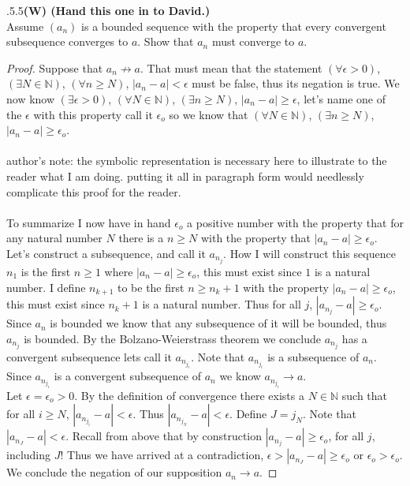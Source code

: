 \documentclass[12pt]{article}
\makeatletter
\theoremstyle{homework}
\newenvironment{exercise}[1]
{\def\@currentlabel{#1}\exercisecore}
{\endexercisecore}
\newcommand\W{{\color{red}\textbf{(W) (Hand this one in to David.)}}}
\makeatother
\begin{document}
\newpage
\begin{exercise}

2.5.5\W\\
Assume $(a_n)$ is a bounded sequence with the property that every convergent subsequence converges to $a$.  Show that $a_n$ must converge to $a$.
\end{exercise}
\begin{proof}
Suppose that $a_n\not\rightarrow a$.  That must mean that the statement $(\forall \epsilon>0)$, $(\exists N\in\mathbb{N})$, $(\forall n\geq N)$, $|a_n-a|<\epsilon$ must be false, thus its negation is true.  We now know $(\exists \epsilon>0)$, $(\forall N\in\mathbb{N})$, $(\exists n\geq N)$, $|a_n-a|\geq \epsilon$, let's name one of the $\epsilon$ with this property call it $\epsilon_o$ so we know that $(\forall N\in\mathbb{N})$, $(\exists n\geq N)$, $|a_n-a|\geq \epsilon_o$.\\\\
author's note: the symbolic representation is necessary here to illustrate to the reader what I am doing.  putting it all in paragraph form would needlessly complicate this proof for the reader.\\\\
To summarize I now have in hand $\epsilon_o$ a positive number with the property that for any natural number $N$ there is a $n\geq N$ with the property that $|a_n-a|\geq \epsilon_o$.\\
Let's construct a subsequence, and call it $a_{n_j}$.  How I will construct this sequence $n_1$ is the first $n\geq 1$ where $|a_n-a|\geq \epsilon_o$, this must exist since $1$ is a natural number.  I define $n_{k+1}$ to be the first $n\geq n_k+1$ with the property $|a_n-a|\geq \epsilon_o$, this must exist since $n_k+1$ is a natural number.  Thus for all $j$, $|a_{n_j}-a|\geq \epsilon_o$.\\
Since $a_n$ is bounded we know that any subsequence of it will be bounded, thus $a_{n_j}$ is bounded.  By the Bolzano-Weierstrass theorem we conclude $a_{n_j}$ has a convergent subsequence lets call it $a_{n_{j_i}}$.  Note that $a_{n_{j_i}}$ is a subsequence of $a_n$.  Since $a_{n_{j_i}}$ is a convergent subsequence of $a_n$ we know $a_{n_{j_i}}\rightarrow a$.\\
Let $\epsilon=\epsilon_o>0$.  By the definition of convergence there exists a $N\in\mathbb{N}$ such that for all $i\geq N$, $|a_{n_{j_i}}-a|<\epsilon$.  Thus $|a_{n_{j_N}}-a|<\epsilon$.  Define $J=j_N$.  Note that $|a_{n_{J}}-a|<\epsilon$.  Recall from above that by construction $|a_{n_j}-a|\geq \epsilon_o$, for all $j$, including $J$!  Thus we have arrived at a contradiction, $\epsilon>|a_{n_J}-a|\geq \epsilon_o$ or $\epsilon_o>\epsilon_o$.  We conclude the negation of our supposition $a_n\rightarrow a$.
\end{proof}
\end{document}
